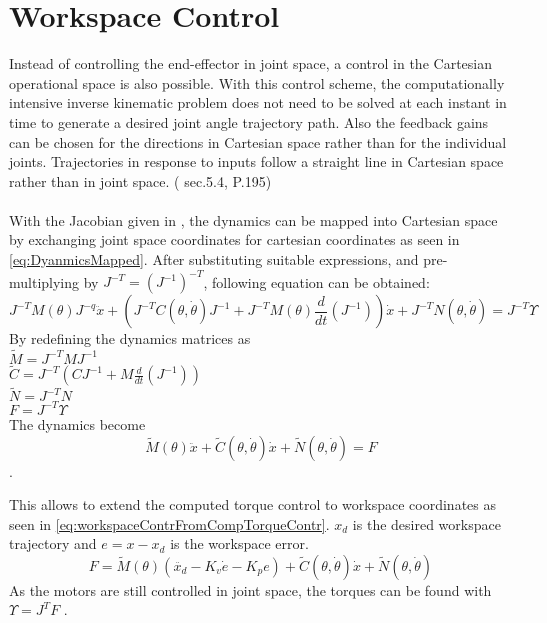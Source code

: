 \section{Workspace Control}
Instead of controlling the end-effector in joint space, a control in the Cartesian operational space is also possible. 
With this control scheme, the computationally intensive inverse kinematic problem does not need to be solved at each instant in time to generate a desired joint angle trajectory path. Also the feedback gains can be chosen for the directions in Cartesian space rather than for the individual joints. Trajectories in response to inputs follow a straight line in Cartesian space rather than in joint space. (\cite{MathIntroRobManip} sec.5.4, P.195)\\
\\
With the Jacobian given in , the dynamics can be mapped into Cartesian space by exchanging joint space coordinates for cartesian coordinates as seen in \ref{eq:DyanmicsMapped}. After substituting suitable expressions, and pre-multiplying by $ J^{-T} = (J^{-1})^{-T}$, following equation can be obtained:\\
\begin{equation} \label{eq:DyanmicsMapped}
	J^{-T} M(\theta) J^{-q} \ddot{x} + (J^{-T} C(\theta,\dot{\theta}) J^{-1} +J^{-T} M(\theta) \frac{d}{dt} (J^{-1}))\dot{x} + J^{-T} N(\theta, \dot{\theta}) = J^{-T}  \Upsilon
\end{equation}
By redefining the dynamics matrices as\\
$ \tilde{M} = J^{-T} M J^{-1}$\\
$ \tilde{C} = J^{-T} (C J^{-1} + M \frac{d}{dt} (J^{-1}))$\\
$ \tilde{N} = J^{-T} N$\\
$ F = J^{-T} \Upsilon$\\
The dynamics become\\

\begin{equation}
	\tilde{M} (\theta) \ddot{x} + \tilde{C} (\theta, \dot{\theta}) \dot{x} + \tilde{N} (\theta,\dot{\theta}) = F
\end{equation}
.

This allows to extend the computed torque control to workspace coordinates as seen in \ref{eq:workspaceContrFromCompTorqueContr}. $x_d$ is the desired workspace trajectory and $ e=x-x_d$ is the workspace error. 
\begin{equation} \label{eq:workspaceContrFromCompTorqueContr}
	F=\tilde{M} (\theta) (\ddot{x_d} - K_v \dot{e} - K_p e ) + \tilde{C}(\theta,\dot{\theta})\dot{x} + \tilde{N}(\theta,\dot{\theta})
\end{equation}
As the motors are still controlled in joint space, the torques can be found with \\
$\Upsilon = J^T F$ .\\


